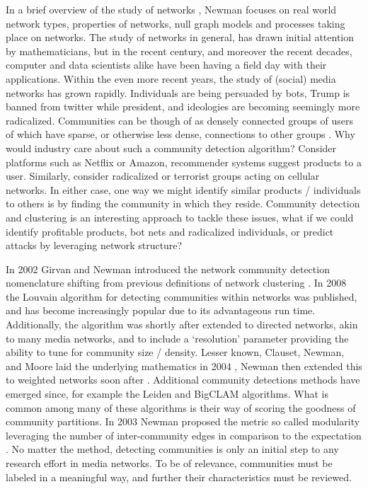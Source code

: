 \documentclass[a4paper, 10pt, twocolumn]{article}
\begin{document}
In a brief overview of the study of networks \cite{struc_funct_cnets}, Newman focuses on real world network types, properties of networks, null graph models and processes taking place on networks.
The study of networks in general, has drawn initial attention by mathematicians, but in the recent century, and moreover the recent decades, computer and data scientists alike have been having a field day with their applications.
Within the even more recent years, the study of (social) media networks has grown rapidly.
Individuals are being persuaded by bots, Trump is banned from twitter while president, and ideologies are becoming seemingly more radicalized.
Communities can be though of as densely connected groups of users of which have sparse, or otherwise less dense, connections to other groups \cite{com_struct_in_soc_and_bio}.
Why would industry care about such a community detection algorithm?
Consider platforms such as Netflix or Amazon, recommender systems suggest products to a user.
Similarly, consider radicalized or terrorist groups acting on cellular networks.
In either case, one way we might identify similar products / individuals to others is by finding the community in which they reside.
Community detection and clustering is an interesting approach to tackle these issues, what if we could identify profitable products, bot nets and radicalized individuals, or predict attacks by leveraging network structure?

In 2002 Girvan and Newman introduced the network community detection nomenclature shifting from previous definitions of network clustering \cite{com_struct_in_soc_and_bio}.
In 2008 the Louvain algorithm \cite{louvain} for detecting communities within networks was published, and has become increasingly popular due to its advantageous run time.
Additionally, the algorithm was shortly after extended to directed networks, akin to many media networks, and to include a `resolution' parameter \cite{louvain_resolution, com_struct_indir} providing the ability to tune for community size / density.
Lesser known, Clauset, Newman, and Moore laid the underlying mathematics in 2004 \cite{finding_comm_struct}, Newman then extended this to weighted networks soon after \cite{analysis_of_wnets}.
Additional community detections methods have emerged since, for example the Leiden \cite{louvain_2_leiden} and BigCLAM \cite{bigclam} algorithms.
What is common among many of these algorithms is their way of scoring the goodness of community partitions.
In 2003 Newman proposed the metric so called modularity leveraging the number of inter-community edges in comparison to the expectation \cite{finding_and_evaling_comm_struct}.
No matter the method, detecting communities is only an initial step to any research effort in media networks.
To be of relevance, communities must be labeled in a meaningful way, and further their characteristics must be reviewed.
\end{document}
